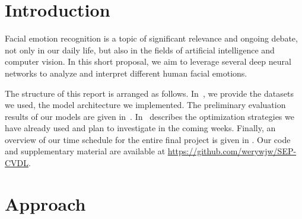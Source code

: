 \section{Introduction}
\label{sec:intro}

Facial emotion recognition is a topic of significant relevance and ongoing debate, not only in our daily life, but also in the fields of artificial intelligence and computer vision.
In this short proposal, we aim to leverage several deep neural networks to analyze and interpret different human facial emotions.

The structure of this report is arranged as follows. 
In~, 
we provide the datasets we used, 
the model architecture we implemented. 
The preliminary evaluation results of our models are given in~. 
In~ describes the optimization strategies we have already used and plan to investigate in the coming weeks. 
Finally,
an overview of our time schedule for the entire final project is given in . 
Our code and supplementary material are available at \url{https://github.com/werywjw/SEP-CVDL}.




\section{Approach}
\label{sec:approach}

